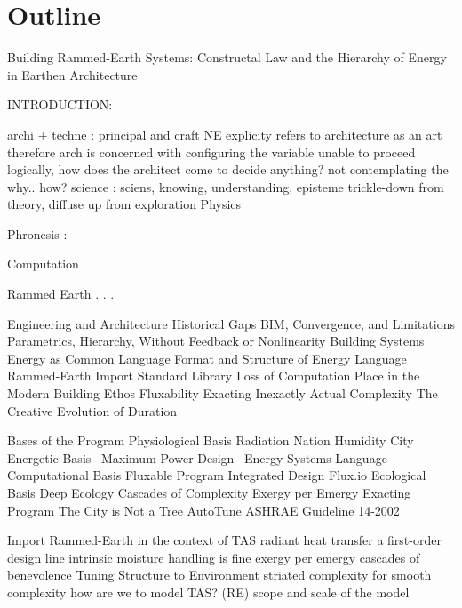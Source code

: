 \section{Outline}

Building Rammed-Earth Systems: Constructal Law and the Hierarchy of Energy in Earthen Architecture

INTRODUCTION:

\begin{outline}
\1 archi + techne : principal and craft
  \2 NE explicity refers to architecture as an art
    \2 therefore arch is concerned with configuring the variable
      \3 unable to proceed logically, how does the architect come to decide anything?
    \2 not contemplating the why.. how?
\1 science : sciens, knowing, understanding, episteme
  \2 trickle-down from theory, diffuse up from exploration
  \2 Physics

  
\1 Phronesis :

\1 Computation


\1 Rammed Earth
. . .



\1 Engineering and Architecture
  \2 Historical Gaps
  \2 BIM, Convergence, and Limitations
    \3 Parametrics, Hierarchy, Without Feedback or Nonlinearity
\1 Building Systems
  \2 Energy as Common Language
  \2 Format and Structure of Energy Language
\1 Rammed-Earth
  \2 Import Standard Library
  \2 Loss of Computation
  \2 Place in the Modern Building Ethos
\1 Fluxability
  \2 Exacting Inexactly
  \2 Actual Complexity
  \2 The Creative Evolution of Duration
\end{outline}












\begin{outline}
\1 Bases of the Program
  \2 Physiological Basis
    \3 Radiation Nation
    \3 Humidity City
  \2 Energetic Basis
    \ Maximum Power Design
    \ Energy Systems Language
  \2 Computational Basis
    \3 Fluxable Program
      \4 Integrated Design
        \4 Flux.io
  \2 Ecological Basis
    \3 Deep Ecology
    \3 Cascades of Complexity
    \3 Exergy per Emergy
    \3 Exacting Program
      \4 The City is Not a Tree
      \4 AutoTune
      \4 ASHRAE Guideline 14-2002



    \2 Import Rammed-Earth in the context of TAS
      \3 radiant heat transfer a first-order design line
      \3 intrinsic moisture handling is fine
      \3 exergy per emergy
      \3 cascades of benevolence
    \2 Tuning Structure to Environment
      \3 striated complexity for smooth complexity
      \3 how are we to model TAS? (RE)
      \3 scope and scale of the model
    \3


\end{outline}



